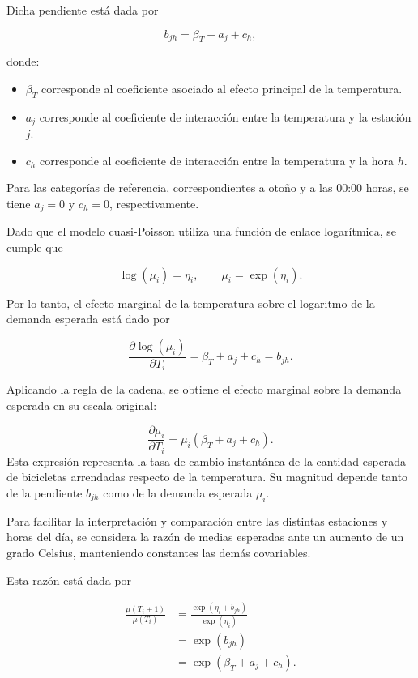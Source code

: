 \documentclass[12pt, a4paper]{article}
\numberwithin{equation}{section}
\begin{document}
Dicha pendiente está dada por

\[
b_{jh}=\beta_T+a_j+c_h,
\]

donde:

\begin{itemize}
    \item $\beta_T$ corresponde al coeficiente asociado
    al efecto principal de la temperatura.

    \item $a_j$ corresponde al coeficiente de interacción
    entre la temperatura y la estación $j$.

    \item $c_h$ corresponde al coeficiente de interacción
    entre la temperatura y la hora $h$.
\end{itemize}

Para las categorías de referencia, correspondientes
a otoño y a las 00:00 horas, se tiene $a_j=0$ y $c_h=0$,
respectivamente.

Dado que el modelo cuasi-Poisson utiliza una función
de enlace logarítmica, se cumple que

\[
\log(\mu_i)=\eta_i,
\qquad
\mu_i=\exp(\eta_i).
\]

Por lo tanto, el efecto marginal de la temperatura
sobre el logaritmo de la demanda esperada está dado por

\[
\frac{\partial\log(\mu_i)}{\partial T_i}
=\beta_T+a_j+c_h=b_{jh}.
\]

Aplicando la regla de la cadena, se obtiene el efecto
marginal sobre la demanda esperada en su escala original:

\[
\frac{\partial\mu_i}{\partial T_i}
=
\mu_i(\beta_T+a_j+c_h).
\]
\newpage
Esta expresión representa la tasa de cambio instantánea
de la cantidad esperada de bicicletas arrendadas respecto
de la temperatura. Su magnitud depende tanto de la
pendiente $b_{jh}$ como de la demanda esperada $\mu_i$.

Para facilitar la interpretación y comparación entre
las distintas estaciones y horas del día, se considera
la razón de medias esperadas ante un aumento de un
grado Celsius, manteniendo constantes las demás
covariables.

Esta razón está dada por

\begin{align*}
\frac{\mu(T_i+1)}{\mu(T_i)}
&=\frac{\exp(\eta_i+b_{jh})}
        {\exp(\eta_i)}\\
&=\exp(b_{jh})\\
&=\exp(\beta_T+a_j+c_h).
\end{align*}
\end{document}
